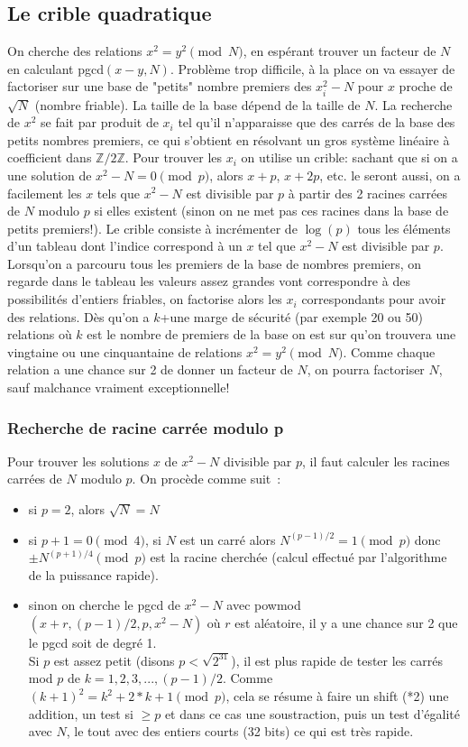 \documentclass[a4paper,11pt]{article}
\newcommand{\Z}{{\mathbb{Z}}}
\begin{document}
\subsection{Le crible quadratique}
On cherche des relations $x^2=y^2 \pmod N$, en espérant trouver un
facteur de $N$  en calculant pgcd$(x-y,N)$.
Problème trop difficile, à la place on va essayer de factoriser sur
une base de "petits" nombre premiers des $x_i^2-N$ pour $x$ 
proche de $\sqrt{N}$ (nombre friable). 
La taille de la base dépend de la taille de $N$. 
La recherche de $x^2$ se fait par produit de $x_i$ 
tel qu'il n'apparaisse que des carrés de la base des petits 
nombres premiers, ce qui s'obtient en résolvant 
un gros système linéaire à coefficient dans $\Z/2\Z$.
Pour trouver les $x_i$ on utilise un crible: 
sachant que si on a une solution de $x^2-N=0 \pmod p$, 
alors $x+p$, $x+2p$, etc. le seront aussi, on a facilement les $x$ 
tels que $x^2-N$ est divisible par $p$ à partir des 2 racines carrées 
de $N$ modulo $p$ si elles existent 
(sinon on ne met pas ces racines dans la base de petits premiers!). 
Le crible consiste à incrémenter de $\log(p)$ 
tous les éléments d'un tableau dont l'indice correspond 
à un $x$ tel que $x^2-N$ est divisible par $p$. 
Lorsqu'on a parcouru tous les premiers de la base de nombres premiers, 
on regarde dans le tableau les valeurs assez grandes 
vont correspondre à des possibilités d'entiers friables, 
on factorise alors les $x_i$ correspondants pour avoir des relations. 
Dès qu'on a $k$+une marge de sécurité (par exemple 20 ou 50) 
relations où $k$ est le nombre de premiers de la base 
on est sur qu'on trouvera une vingtaine ou une cinquantaine de
relations 
$x^2=y^2 \pmod N$. 
Comme chaque relation a une chance sur 2 de donner un facteur de $N$, 
on pourra factoriser $N$, sauf malchance vraiment exceptionnelle!

\subsubsection{Recherche de racine carrée modulo p}
Pour trouver les solutions $x$ de $x^2-N$ divisible par $p$, il
faut calculer les racines carr\'ees de $N$ modulo $p$. On proc\`ede
comme suit~:
\begin{itemize}
\item si $p=2$, alors $\sqrt{N}=N$
\item
si $p+1=0 \pmod 4$, si $N$ est un carré alors $N^{(p-1)/2}=1 \pmod p$ 
donc $\pm N^{(p+1)/4} \pmod p$ est la racine cherchée (calcul
effectu\'e par l'algorithme de la puissance rapide).
\item sinon on cherche le pgcd de $x^2-N$ avec
  powmod$(x+r,(p-1)/2,p,x^2-N)$ 
où $r$ est aléatoire, il y a une chance sur 2 que le pgcd soit de degré 1.\\
Si $p$ est assez petit (disons $p< \sqrt{2^{31}}$), il est plus rapide de
tester les carrés mod $p$ de $k=1,2,3, ..., (p-1)/2$. Comme
$(k+1)^2=k^2+2*k+1 \pmod p$, cela se résume à faire un shift (*2) une
addition, un test si $\geq p$ et dans ce cas une soustraction, puis un test
d'égalité avec $N$, le tout avec des entiers courts (32 bits) ce qui est
très rapide.
\end{itemize}
\end{document}
